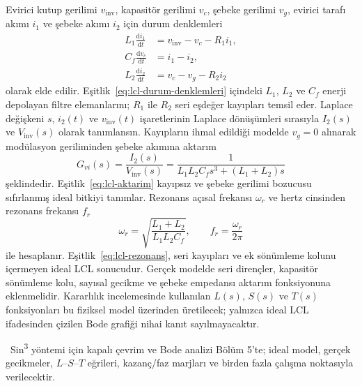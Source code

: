 Evirici kutup gerilimi $v_{\mathrm{inv}}$, kapasitör gerilimi $v_c$, şebeke gerilimi $v_g$, evirici tarafı akımı $i_1$ ve şebeke akımı $i_2$ için durum denklemleri
\begin{equation}
  \begin{aligned}
    L_1\frac{\mathrm{d}i_1}{\mathrm{d}t} &= v_{\mathrm{inv}}-v_c-R_1i_1, \\
    C_f\frac{\mathrm{d}v_c}{\mathrm{d}t} &= i_1-i_2, \\
    L_2\frac{\mathrm{d}i_2}{\mathrm{d}t} &= v_c-v_g-R_2i_2
  \end{aligned}
  \label{eq:lcl-durum-denklemleri}
\end{equation}
olarak elde edilir. Eşitlik~\eqref{eq:lcl-durum-denklemleri} içindeki $L_1$, $L_2$ ve $C_f$ enerji depolayan filtre elemanlarını; $R_1$ ile $R_2$ seri eşdeğer kayıpları temsil eder. Laplace değişkeni $s$, $i_2(t)$ ve $v_{\mathrm{inv}}(t)$ işaretlerinin Laplace dönüşümleri sırasıyla $I_2(s)$ ve $V_{\mathrm{inv}}(s)$ olarak tanımlansın. Kayıpların ihmal edildiği modelde $v_g=0$ alınarak modülasyon geriliminden şebeke akımına aktarım
\begin{equation}
  G_{vi}(s)=\frac{I_2(s)}{V_{\mathrm{inv}}(s)}
  =\frac{1}{L_1L_2C_fs^3+(L_1+L_2)s}
  \label{eq:lcl-aktarim}
\end{equation}
şeklindedir. Eşitlik~\eqref{eq:lcl-aktarim} kayıpsız ve şebeke gerilimi bozucusu sıfırlanmış ideal bitkiyi tanımlar. Rezonans açısal frekansı $\omega_r$ ve hertz cinsinden rezonans frekansı $f_r$
\begin{equation}
  \omega_r=\sqrt{\frac{L_1+L_2}{L_1L_2C_f}},
  \qquad f_r=\frac{\omega_r}{2\pi}
  \label{eq:lcl-rezonans}
\end{equation}
ile hesaplanır. Eşitlik~\eqref{eq:lcl-rezonans}, seri kayıpları ve ek sönümleme kolunu içermeyen ideal LCL sonucudur. Gerçek modelde seri dirençler, kapasitör sönümleme kolu, sayısal gecikme ve şebeke empedansı aktarım fonksiyonuna eklenmelidir. Kararlılık incelemesinde kullanılan $L(s)$, $S(s)$ ve $T(s)$ fonksiyonları bu fiziksel model üzerinden üretilecek; yalnızca ideal LCL ifadesinden çizilen Bode grafiği nihai kanıt sayılmayacaktır.

\begin{center}
\juriistegietiketi\ \small Sin\textsuperscript{3} yöntemi için kapalı çevrim ve Bode analizi Bölüm 5'te; ideal model, gerçek gecikmeler, $L$--$S$--$T$ eğrileri, kazanç/faz marjları ve birden fazla çalışma noktasıyla verilecektir.
\end{center}

